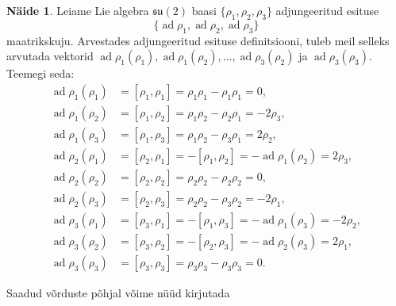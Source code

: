 \documentclass[12pt,a4paper,oneside]{article}
\theoremstyle{plain}
\theoremstyle{definition}
\newtheorem{naide}{Näide}[section]
\numberwithin{equation}{section}
\def\su2{{\mathfrak{ su}\left(2\right)}}
\DeclareMathOperator{\ad}{ad}
\begin{document}
\begin{naide}
Leiame Lie algebra $\su2$ baasi $\{\rho_1, \rho_2, \rho_3\}$ 
adjungeeritud esituse
\[\{\ad \rho_1, \ad \rho_2, \ad \rho_3\}\]
maatrikskuju. Arvestades adjungeeritud esituse definitsiooni, tuleb 
meil selleks arvutada vektorid $\ad \rho_1 \left(\rho_1\right), 
\ad \rho_1 \left(\rho_2\right), \ldots, 
\ad \rho_3 \left(\rho_2\right)$ ja $\ad \rho_3 \left(\rho_3\right)$. 
Teemegi seda:
\begin{align*}
\ad \rho_1 \left(\rho_1\right) &= \left[\rho_1, \rho_1\right] = 
	\rho_1 \rho_1 - \rho_1 \rho_1 = 0, \\
\ad \rho_1 \left(\rho_2\right) &= \left[\rho_1, \rho_2\right] = 
	\rho_1 \rho_2 - \rho_2 \rho_1 = -2\rho_3, \\
\ad \rho_1 \left(\rho_3\right) &= \left[\rho_1, \rho_3\right] = 
	\rho_1 \rho_2 - \rho_3 \rho_1 = 2\rho_2, \\
\ad \rho_2 \left(\rho_1\right) &= \left[\rho_2, \rho_1\right] = 
	-\left[\rho_1, \rho_2\right] = - \ad \rho_1 \left(\rho_2\right) 
	= 2\rho_3, \\
\ad \rho_2 \left(\rho_2\right) &= \left[\rho_2, \rho_2\right] = 
	\rho_2 \rho_2 - \rho_2 \rho_2 = 0, \\
\ad \rho_2 \left(\rho_3\right) &= \left[\rho_2, \rho_3\right] = 
	\rho_2 \rho_2 - \rho_3 \rho_2 = -2\rho_1, \\
\ad \rho_3 \left(\rho_1\right) &= \left[\rho_3, \rho_1\right] = 
	-\left[\rho_1, \rho_3\right] = - 
	\ad \rho_1 \left(\rho_3\right) = -2\rho_2, \\
\ad \rho_3 \left(\rho_2\right) &= \left[\rho_3, \rho_2\right] = 
	-\left[\rho_2, \rho_3\right] = 
	-\ad \rho_2 \left(\rho_3\right) = 2\rho_1, \\
\ad \rho_3 \left(\rho_3\right) &= \left[\rho_3, \rho_3\right] = 
	\rho_3 \rho_3 - \rho_3 \rho_3 = 0.
\end{align*}

Saadud võrduste põhjal võime nüüd kirjutada


\end{naide}
\end{document}
